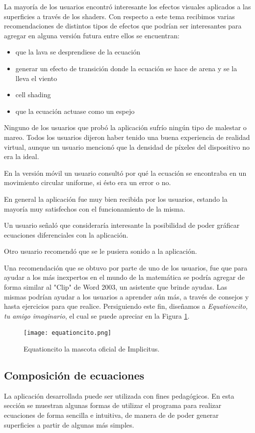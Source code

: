 \documentclass[12pt]{article}
\begin{document}
La mayoría de los usuarios encontró interesante los efectos visuales aplicados a las superficies a través de los shaders. Con respecto a este tema recibimos varias recomendaciones de distintos tipos de efectos que podrían ser interesantes para agregar en alguna versión futura entre ellos se encuentran: 
\begin{itemize}
\item que la lava se desprendiese de la ecuación
\item generar un efecto de transición donde la ecuación se hace de arena y se la lleva el viento
\item cell shading
\item que la ecuación actuase como un espejo
\end{itemize}
Ninguno de los usuarios que probó la aplicación sufrío ningún tipo de malestar o mareo. Todos los usuarios dijeron haber tenido una buena experiencia de realidad virtual, aunque un usuario mencionó que la densidad de píxeles del dispositivo no era la ideal.

En la versión móvil un usuario consultó por qué la ecuación se encontraba en un movimiento circular uniforme, si ésto era un error o no.

En general la aplicación fue muy bien recibida por los usuarios, estando la mayoría muy satisfechos con el funcionamiento de la misma.

Un usuario señaló que consideraría interesante la posibilidad de poder gráficar ecuaciones diferenciales con la aplicación. 

Otro usuario recomendó que se le pusiera sonido a la aplicación.

Una recomendación que se obtuvo por parte de uno de los usuarios, fue que para ayudar a los más inexpertos en el mundo de la matemática se podría agregar de forma similar al "Clip" de Word 2003, un asistente que brinde ayudas. Las mismas podrían ayudar a los usuarios a aprender aún más, a través de consejos y hasta ejercicios para que realice. Persiguiendo este fin, diseñamos a \textit{Equationcito, tu amigo imaginario}, el cual se puede apreciar en la Figura \ref{equationcito}.

\begin{figure}[h]
\texttt{[image: equationcito.png]}
\caption{Equationcito la mascota oficial de Implicitus.}
\label{equationcito}
\end{figure}


\subsection{Composición de ecuaciones}
La aplicación desarrollada puede ser utilizada con fines pedagógicos. En esta sección se muestran algunas formas de utilizar el programa para  realizar ecuaciones de forma sencilla e intuitiva, de manera de de poder generar superficies a partir de algunas más simples.
\end{document}
